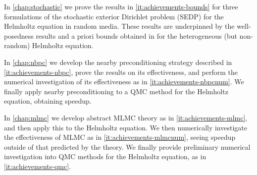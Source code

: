 In \cref{chap:stochastic} we prove the results in \cref{it:achievements-bounds} for three formulations of the stochastic exterior Dirichlet problem (SEDP) for the Helmholtz equation in random media. These results are underpinned by the well-posedness results and a priori bounds obtained in \cite{GrPeSp:19} for the heterogeneous (but non-random) Helmholtz equation.

In \cref{chap:nbpc} we develop the nearby preconditioning strategy described in \cref{it:achievements-nbpc}, prove the results on its effectiveness, and perform the numerical investigation of its effectiveness as in \cref{it:achievements-nbpcnum}. We finally apply nearby preconditioning to a QMC method for the Helmholtz equation, obtaining speedup.

In \cref{chap:mlmc} we develop abstract MLMC theory as in \cref{it:achievements-mlmc}, and then apply this to the Helmholtz equation. We then numerically investigate the effectiveness of MLMC as in \cref{it:achievements-mlmcnum}, seeing speedup outside of that predicted by the theory. We finally provide preliminary numerical investigation into QMC methods for the Helmholtz equation, as in \cref{it:achievements-qmc}.

